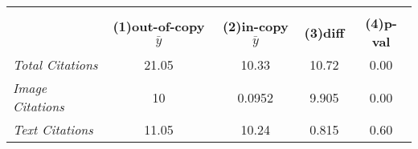 {
\def\sym#1{\ifmmode^{#1}\else\(^{#1}\)\fi}
\begin{tabular}{l*{1}{cccc}}
\toprule
                    &\multicolumn{4}{c}{}                               \\
                    &\textbf{(1)out-of-copy $\bar{y}$}&\textbf{(2)in-copy $\bar{y}$}&\textbf{(3)diff}&\textbf{(4)p-val}\\
\midrule
\emph{Total Citations}&       21.05&       10.33&       10.72&        0.00\\
\emph{Image Citations}&          10&      0.0952&       9.905&        0.00\\
\emph{Text Citations}&       11.05&       10.24&       0.815&        0.60\\
\bottomrule
\end{tabular}
}
